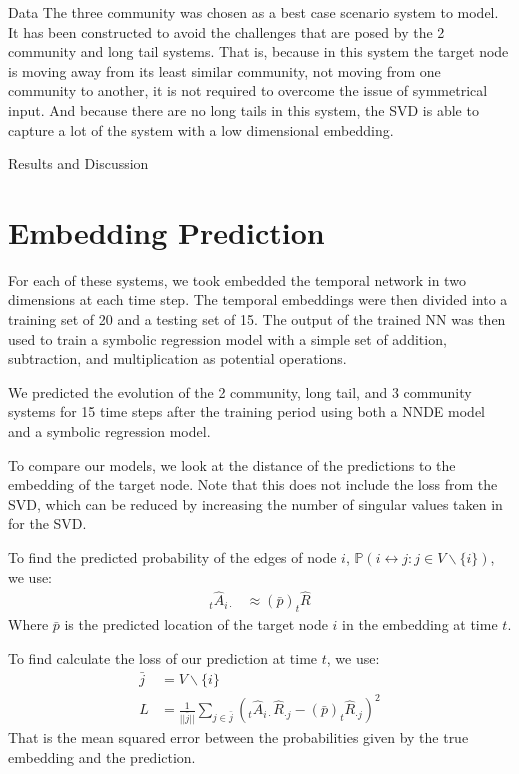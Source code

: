 \documentclass[12pt]{amsbook}
\begin{document}
\begin{chapter}{Data}
    The three community was chosen as a best case scenario system to model. It has been constructed to avoid the challenges that are posed by the 2 community and long tail systems. That is, because in this system the target node is moving away from its least similar community, not moving from one community to another, it is not required to overcome the issue of symmetrical input. And because there are no long tails in this system, the SVD is able to capture a lot of the system with a low dimensional embedding.

\end{chapter}

\begin{chapter}{Results and Discussion}
    \section{Embedding Prediction}
        For each of these systems, we took embedded the temporal network in two dimensions at each time step. The temporal embeddings were then divided into a training set of 20 and a testing set of 15. The output of the trained NN was then used to train a symbolic regression model with a simple set of addition, subtraction, and multiplication as potential operations. 

        We predicted the evolution of the 2 community, long tail, and 3 community systems for 15 time steps after the training period using both a NNDE model and a symbolic regression model.

        To compare our models, we look at the distance of the predictions to the embedding of the target node. Note that this does not include the loss from the SVD, which can be reduced by increasing the number of singular values taken in for the SVD.
        
        To find the predicted probability of the edges of node $i$, $\mathbb{P}(i \leftrightarrow j:j\in V\smallsetminus \{i\})$, we use: 
        \begin{align}
            _t\hat A_{i\cdot} &\approx (\bar p) _t\hat R
        \end{align}
        Where $\bar p$ is the predicted location of the target node $i$ in the embedding at time $t$.

        To find calculate the loss of our prediction at time $t$, we use:
        \begin{align}
            \bar j &= V \smallsetminus \{i\}  \\
            L &= \frac{1}{||\bar j||}\sum_{j\in \bar j}{(_t\hat A_{i\cdot} \hat R_{\cdot j} - (\bar p) _t\hat R_{\cdot j})^2}
        \end{align}
        That is the mean squared error between the probabilities given by the true embedding and the prediction.
        

\end{chapter}
\end{document}
